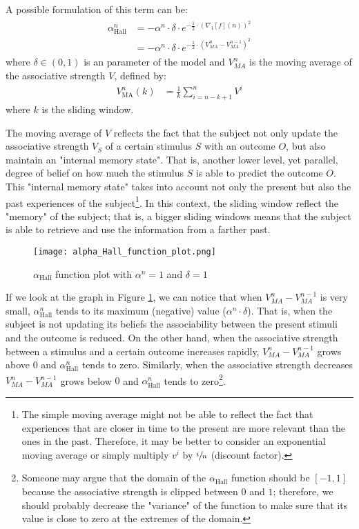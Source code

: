 \documentclass[11pt,a4paper]{article}
\newcommand{\alphahall}{\alpha _{\text{Hall}}}
\begin{document}
A possible formulation of this term can be:
\begin{gather}
	\begin{aligned}
		\alphahall ^n &= - \alpha ^n \cdot \delta \cdot e^{- \frac{1}{2} \cdot 
		\displaystyle{ \left( \nabla_1 [ f ] ( n ) \right) ^2 }} \\
		&= - \alpha ^n \cdot \delta \cdot e ^ {- \frac{1}{2} \cdot \displaystyle{\left(V^n_{MA} - V^{n - 1}_{MA} \right) ^2}}
	\end{aligned}
\end{gather}
where $ \delta \in ( 0, 1 ) $ is an parameter of the model and $V^n_{MA}$ is the moving average of the associative strength $V$, defined by:
\begin{align}
    V ^n _{\text{MA}} (k) &= \frac{1}{k} \sum ^n _{i = n - k + 1} V ^i
\end{align}
where $k$ is the sliding window.

The moving average of $V$ reflects the fact that the subject not only update the associative strength $V_S$ of a certain stimulus $S$ with an outcome $O$, but also maintain an "internal memory state". That is, another lower level, yet parallel, degree of belief on how much the stimulus $S$ is able to predict the outcome $O$. This "internal memory state" takes into account not only the present but also the past experiences of the subject\footnote{The simple moving average might not be able to reflect the fact that experiences that are closer in time to the present are more relevant than the ones in the past. Therefore, it may be better to consider an exponential moving average or simply multiply $v^i$ by $\sfrac{i}{n}$ (discount factor).}. In this context, the sliding window reflect the "memory" of the subject; that is, a bigger sliding windows means that the subject is able to retrieve and use the information from a farther past.

\begin{figure}[h!]
    \centering
    \texttt{[image: alpha\_Hall\_function\_plot.png]}
    \caption{$\alphahall$ function plot with $\alpha^n = 1$ and $\delta = 1$}
    \label{fig:alpha_hall_plot}
\end{figure}

If we look at the graph in Figure \ref{fig:alpha_hall_plot}, we can notice that when $V^n_{MA}-V^{n-1}_{MA}$ is very small, $\alphahall^n$ tends to its maximum (negative) value ($\alpha^n \cdot \delta$). That is, when the subject is not updating its beliefs the associability between the present stimuli and the outcome is reduced. On the other hand, when the associative strength between a stimulus and a certain outcome increases rapidly, $V^n_{MA}-V^{n-1}_{MA}$ grows above $0$ and $\alphahall^n$ tends to zero. Similarly, when the associative strength decreases $V^n_{MA}-V^{n-1}_{MA}$ grows below $0$ and $\alphahall^n$ tends to zero\footnote{Someone may argue that the domain of the $\alphahall$ function should be $[-1,1]$ because the associative strength is clipped between $0$ and $1$; therefore, we should probably decrease the "variance" of the function to make sure that its value is close to zero at the extremes of the domain.}.
\end{document}
